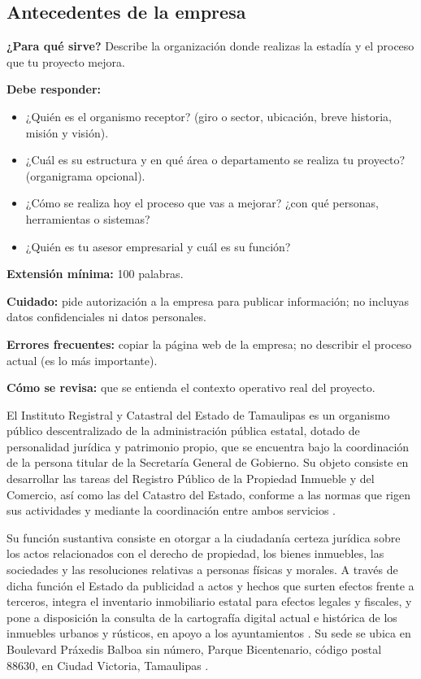 \subsection{Antecedentes de la empresa} \label{sec:antecedentes_empresa} %

\begin{guia}
\textbf{¿Para qué sirve?} Describe la organización donde realizas la estadía y el proceso que tu proyecto mejora.

\textbf{Debe responder:}
\begin{itemize}[nosep,leftmargin=*]
  \item ¿Quién es el organismo receptor? (giro o sector, ubicación, breve historia, misión y visión).
  \item ¿Cuál es su estructura y en qué área o departamento se realiza tu proyecto? (organigrama opcional).
  \item ¿Cómo se realiza hoy el proceso que vas a mejorar? ¿con qué personas, herramientas o sistemas?
  \item ¿Quién es tu asesor empresarial y cuál es su función?
\end{itemize}

\textbf{Extensión mínima:} 100 palabras.

\textbf{Cuidado:} pide autorización a la empresa para publicar información; no incluyas datos confidenciales ni
datos personales.

\textbf{Errores frecuentes:} copiar la página web de la empresa; no describir el proceso actual (es lo más importante).

\textbf{Cómo se revisa:} que se entienda el contexto operativo real del proyecto.
\end{guia}

El Instituto Registral y Catastral del Estado de Tamaulipas es un organismo público descentralizado de la administración pública estatal, dotado de personalidad jurídica y patrimonio propio, que se encuentra bajo la coordinación de la persona titular de la Secretaría General de Gobierno. Su objeto consiste en desarrollar las tareas del Registro Público de la Propiedad Inmueble y del Comercio, así como las del Catastro del Estado, conforme a las normas que rigen sus actividades y mediante la coordinación entre ambos servicios \cite{poe2022irct}.

Su función sustantiva consiste en otorgar a la ciudadanía certeza jurídica sobre los actos relacionados con el derecho de propiedad, los bienes inmuebles, las sociedades y las resoluciones relativas a personas físicas y morales. A través de dicha función el Estado da publicidad a actos y hechos que surten efectos frente a terceros, integra el inventario inmobiliario estatal para efectos legales y fiscales, y pone a disposición la consulta de la cartografía digital actual e histórica de los inmuebles urbanos y rústicos, en apoyo a los ayuntamientos \cite{sgg2023irct}. Su sede se ubica en Boulevard Práxedis Balboa sin número, Parque Bicentenario, código postal 88630, en Ciudad Victoria, Tamaulipas \cite{transparenciairct}.


